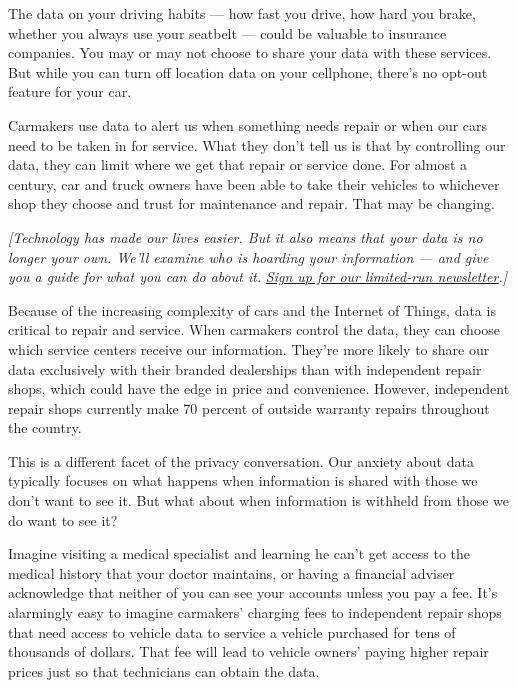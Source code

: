 The data on your driving habits --- how fast you drive, how hard you
brake, whether you always use your seatbelt --- could be valuable to
insurance companies. You may or may not choose to share your data with
these services. But while you can turn off location data on your
cellphone, there's no opt-out feature for your car.

Carmakers use data to alert us when something needs repair or when our
cars need to be taken in for service. What they don't tell us is that by
controlling our data, they can limit where we get that repair or service
done. For almost a century, car and truck owners have been able to take
their vehicles to whichever shop they choose and trust for maintenance
and repair. That may be changing.

\emph{{[}Technology has made our lives easier. But it also means that
your data is no longer your own. We'll examine who is hoarding your
information --- and give you a guide for what you can do about it.}
\href{https://www.nytimes.com/newsletters/privacy-project?action=click\&module=Intentional\&pgtype=Article}{\emph{Sign
up for our limited-run newsletter}}\emph{.{]}}

Because of the increasing complexity of cars and the Internet of Things,
data is critical to repair and service. When carmakers control the data,
they can choose which service centers receive our information. They're
more likely to share our data exclusively with their branded dealerships
than with independent repair shops, which could have the edge in price
and convenience. However, independent repair shops currently make 70
percent of outside warranty repairs throughout the country.

This is a different facet of the privacy conversation. Our anxiety about
data typically focuses on what happens when information is shared with
those we don't want to see it. But what about when information is
withheld from those we do want to see it?

Imagine visiting a medical specialist and learning he can't get access
to the medical history that your doctor maintains, or having a financial
adviser acknowledge that neither of you can see your accounts unless you
pay a fee. It's alarmingly easy to imagine carmakers' charging fees to
independent repair shops that need access to vehicle data to service a
vehicle purchased for tens of thousands of dollars. That fee will lead
to vehicle owners' paying higher repair prices just so that technicians
can obtain the data.

